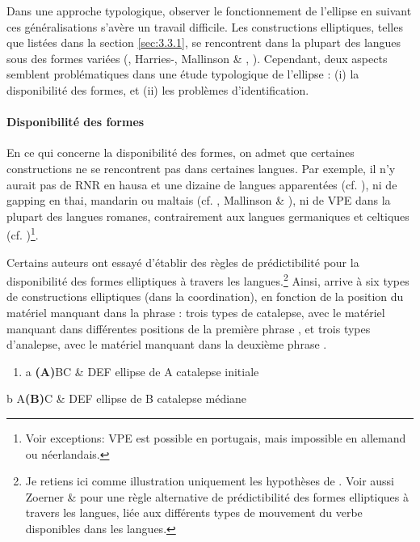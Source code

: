 Dans une approche typologique, observer le fonctionnement de l'ellipse en suivant ces généralisations s'avère un travail difficile. Les constructions elliptiques, telles que listées dans la section \ref{sec:3.3.1}, se rencontrent dans la plupart des langues sous des formes variées (\citet{Sanders1977}, Harries-\citet{Delisle1978}, Mallinson \& \citet{Blake1981}, \citet{Haspelmath2007}). Cependant, deux aspects semblent problématiques dans une étude typologique de l'ellipse : (i) la disponibilité des formes, et (ii) les problèmes d'identification. 

\paragraph[Disponibilité des formes]{Disponibilité des formes}
En ce qui concerne la disponibilité des formes, on admet que certaines constructions ne se rencontrent pas dans certaines langues. Par exemple, il n'y aurait pas de RNR en hausa et une dizaine de langues apparentées (cf. \citet{Koutsoudas1971}), ni de gapping en thai, mandarin ou maltais (cf. \citet{Rosenbaum1977}, Mallinson \& \citet{Blake1981}), ni de VPE dans la plupart des langues romanes, contrairement aux langues germaniques et celtiques (cf. \citet{Chao1988})\footnote{Voir exceptions: VPE est possible en portugais, mais impossible en allemand ou néerlandais.}. 

Certains auteurs ont essayé d'établir des règles de prédictibilité pour la disponibilité des formes elliptiques à travers les langues.\footnote{Je retiens ici comme illustration uniquement les hypothèses de \citet{Sanders1977}. Voir aussi Zoerner \& \citet{Agbayani2000} pour une règle alternative de prédictibilité des formes elliptiques à travers les langues, liée aux différents types de mouvement du verbe disponibles dans les langues.} Ainsi, \citet{Sanders1977} arrive à six types de constructions elliptiques (dans la coordination), en fonction de la position du matériel manquant dans la phrase : trois types de catalepse, avec le matériel manquant dans différentes positions de la première phrase , et trois types d'analepse, avec le matériel manquant dans la deuxième phrase .


\begin{enumerate}
\item \label{bkm:Ref305327151}a  \textbf{(A)}BC \& DEF  ellipse de A    catalepse initiale  


\end{enumerate}
  b  A\textbf{(B)}C \& DEF  ellipse de B    catalepse médiane

